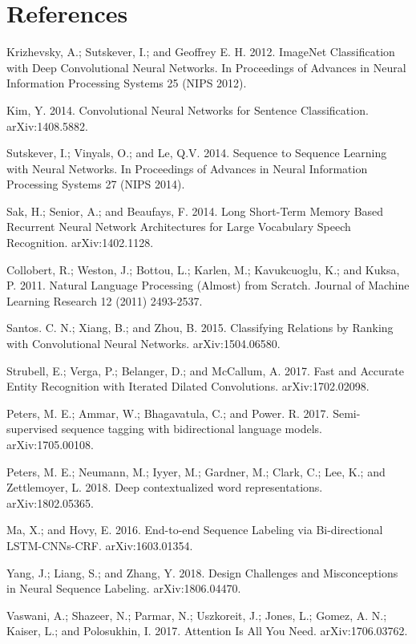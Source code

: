 \documentclass[letterpaper]{article} %
\begin{document}
\section{References}

\smallskip \noindent
Krizhevsky, A.; Sutskever, I.; and Geoffrey E. H. 2012. ImageNet Classification with Deep Convolutional Neural Networks. In Proceedings of  Advances in Neural Information Processing Systems 25 (NIPS 2012).

\smallskip \noindent
Kim, Y. 2014. Convolutional Neural Networks for Sentence Classification. arXiv:1408.5882.

\smallskip \noindent
Sutskever, I.; Vinyals, O.; and Le, Q.V. 2014. Sequence to Sequence Learning with Neural Networks. In Proceedings of Advances in Neural Information Processing Systems 27 (NIPS 2014).

\smallskip \noindent
Sak, H.; Senior, A.; and Beaufays, F. 2014. Long Short-Term Memory Based Recurrent Neural Network Architectures for Large Vocabulary Speech Recognition. arXiv:1402.1128.

\smallskip \noindent 
Collobert, R.; Weston, J.; Bottou, L.; Karlen, M.; Kavukcuoglu, K.; and Kuksa, P. 2011. Natural Language Processing (Almost) from Scratch. Journal of Machine Learning Research 12 (2011) 2493-2537. 

\smallskip \noindent
Santos. C. N.; Xiang, B.; and Zhou, B. 2015. Classifying Relations by Ranking with Convolutional Neural Networks. arXiv:1504.06580. 

\smallskip \noindent
Strubell, E.; Verga, P.; Belanger, D.; and McCallum, A. 2017. Fast and Accurate Entity Recognition with Iterated Dilated Convolutions. arXiv:1702.02098. 

\smallskip \noindent
Peters, M. E.; Ammar, W.; Bhagavatula, C.; and Power. R.  2017. Semi-supervised sequence tagging with bidirectional language models. arXiv:1705.00108.

\smallskip \noindent 
Peters, M. E.; Neumann, M.; Iyyer, M.; Gardner, M.; Clark, C.; Lee, K.; and Zettlemoyer, L. 2018. Deep contextualized word representations. arXiv:1802.05365. 

\smallskip \noindent
Ma, X.; and Hovy, E. 2016. End-to-end Sequence Labeling via Bi-directional LSTM-CNNs-CRF. arXiv:1603.01354. 

\smallskip \noindent
Yang, J.; Liang, S.; and Zhang, Y. 2018. Design Challenges and Misconceptions in Neural Sequence Labeling. arXiv:1806.04470. 

\smallskip \noindent
Vaswani, A.; Shazeer, N.; Parmar, N.; Uszkoreit, J.; Jones, L.; Gomez, A. N.; Kaiser, L.; and Polosukhin, I. 2017. Attention Is All You Need. arXiv:1706.03762. 
\end{document}
